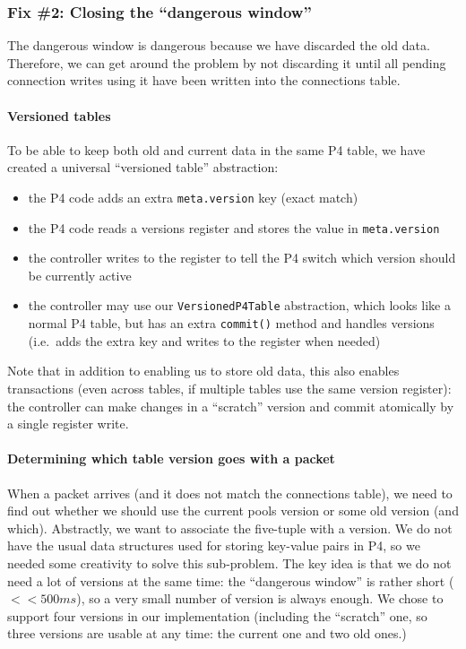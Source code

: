 \documentclass[11pt,oneside,a4paper]{article}
\begin{document}
\subsubsection{Fix \#2: Closing the ``dangerous window''}
The dangerous window is dangerous because we have discarded the old data.
Therefore, we can get around the problem by not discarding it until all pending
connection writes using it have been written into the connections table.

\paragraph{Versioned tables}
To be able to keep both old and current data in the same P4 table, we have
created a universal ``versioned table'' abstraction:

\begin{itemize}
\item the P4 code adds an extra \texttt{meta.version} key (exact match)
\item the P4 code reads a versions register and stores the value in
    \texttt{meta.version}
\item the controller writes to the register to tell the P4 switch which version
    should be currently active
\item the controller may use our \texttt{VersionedP4Table} abstraction, which
    looks like a normal P4 table, but has an extra \texttt{commit()} method and
    handles versions (i.e.~adds the extra key and writes to the register when
    needed)
\end{itemize}

Note that in addition to enabling us to store old data, this also enables
transactions (even across tables, if multiple tables use the same version
register): the controller can make changes in a ``scratch'' version and commit
atomically by a single register write.

\paragraph{Determining which table version goes with a packet}

When a packet arrives (and it does not match the connections table), we need to
find out whether we should use the current pools version or some old version
(and which).
Abstractly, we want to associate the five-tuple with a version.
We do not have the usual data structures used for storing key-value pairs in P4,
so we needed some creativity to solve this sub-problem.
The key idea is that we do not need a lot of versions at the same time: the
``dangerous window'' is rather short ($<<500ms$), so a very small number of
version is always enough.
We chose to support four versions in our implementation (including the
``scratch'' one, so three versions are usable at any time: the current one and
two old ones.)
\end{document}
